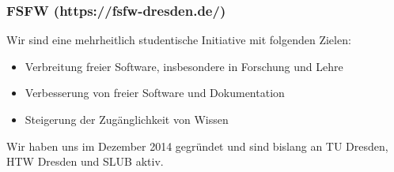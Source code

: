 
\begin{frame}
	\frametitle{FSFW (https://fsfw-dresden.de/)}

	Wir sind eine mehrheitlich studentische Initiative mit folgenden Zielen:
	\begin{itemize}
		\item Verbreitung freier Software, insbesondere in Forschung und Lehre
		\item Verbesserung von freier Software und Dokumentation
		\item Steigerung der Zugänglichkeit von Wissen
	\end{itemize}
	\par
	Wir haben uns im Dezember 2014 gegründet und sind bislang an TU Dresden, HTW Dresden und SLUB aktiv. 
\end{frame}
